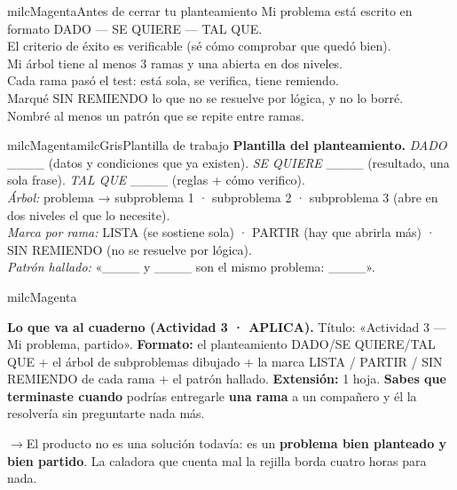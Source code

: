 \documentclass[11pt,letterpaper]{article}
\newcommand{\puente}[1]{%
  \begin{puentebox}%
    \textcolor{milcGradeDark}{$\rightarrow$}\hspace{2mm}#1%
  \end{puentebox}%
}
\newcommand{\checkbox}{\textcolor{milcGradeDark}{\fbox{\phantom{x}}}\hspace{5pt}}
\begin{document}
\begin{drawbox}{milcMagenta}{Antes de cerrar tu planteamiento}
\checkbox Mi problema está escrito en formato DADO --- SE QUIERE --- TAL QUE. \\[1mm]
\checkbox El criterio de éxito es verificable (sé cómo comprobar que quedó bien). \\[1mm]
\checkbox Mi árbol tiene al menos 3 ramas y una abierta en dos niveles. \\[1mm]
\checkbox Cada rama pasó el test: está sola, se verifica, tiene remiendo. \\[1mm]
\checkbox Marqué SIN REMIENDO lo que no se resuelve por lógica, y no lo borré. \\[1mm]
\checkbox Nombré al menos un patrón que se repite entre ramas.
\end{drawbox}

\begin{softbox}{milcMagenta}{milcGris}{Plantilla de trabajo}
\textbf{Plantilla del planteamiento.} \textit{DADO} \_\_\_\_ (datos y condiciones que ya existen). \textit{SE QUIERE} \_\_\_\_ (resultado, una sola frase). \textit{TAL QUE} \_\_\_\_ (reglas + cómo verifico). \\[1mm]
\textit{Árbol:} problema → subproblema 1 · subproblema 2 · subproblema 3 (abre en dos niveles el que lo necesite). \\[1mm]
\textit{Marca por rama:} LISTA (se sostiene sola) · PARTIR (hay que abrirla más) · SIN REMIENDO (no se resuelve por lógica). \\[1mm]
\textit{Patrón hallado:} «\_\_\_\_ y \_\_\_\_ son el mismo problema: \_\_\_\_».
\end{softbox}

\begin{infoband}{milcMagenta}


\textbf{Lo que va al cuaderno (Actividad 3 · APLICA).} Título: «Actividad 3 --- Mi problema, partido». \textbf{Formato:} el planteamiento DADO/SE QUIERE/TAL QUE + el árbol de subproblemas dibujado + la marca LISTA / PARTIR / SIN REMIENDO de cada rama + el patrón hallado. \textbf{Extensión:} 1 hoja. \textbf{Sabes que terminaste cuando} podrías entregarle \textbf{una rama} a un compañero y él la resolvería sin preguntarte nada más.
\end{infoband}

\puente{El producto no es una solución todavía: es un \textbf{problema bien planteado y bien partido}. La caladora que cuenta mal la rejilla borda cuatro horas para nada.}
\end{document}
